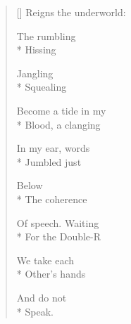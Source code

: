 \label{ch:pandemonium}
\settowidth{\versewidth}{Reigns the underworld:}
\begin{verse}[\versewidth]
Reigns the underworld:

The rumbling\\*
Hissing

Jangling\\*
Squealing

Become a tide in my\\*
Blood, a clanging

In my ear, words\\*
Jumbled just

Below\\*
The coherence

Of speech.   Waiting\\*
For the Double-R

We take each\\*
Other's hands

And do not\\*
Speak.
\end{verse}
